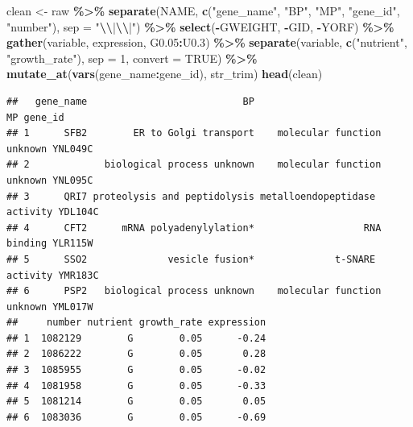 \documentclass[
]{book}
\newenvironment{Shaded}{\begin{snugshade}}{\end{snugshade}}
\newcommand{\AttributeTok}[1]{\textcolor[rgb]{0.13,0.29,0.53}{#1}}
\newcommand{\ConstantTok}[1]{\textcolor[rgb]{0.56,0.35,0.01}{#1}}
\newcommand{\DecValTok}[1]{\textcolor[rgb]{0.00,0.00,0.81}{#1}}
\newcommand{\FloatTok}[1]{\textcolor[rgb]{0.00,0.00,0.81}{#1}}
\newcommand{\FunctionTok}[1]{\textcolor[rgb]{0.13,0.29,0.53}{\textbf{#1}}}
\newcommand{\NormalTok}[1]{#1}
\newcommand{\OtherTok}[1]{\textcolor[rgb]{0.56,0.35,0.01}{#1}}
\newcommand{\SpecialCharTok}[1]{\textcolor[rgb]{0.81,0.36,0.00}{\textbf{#1}}}
\newcommand{\StringTok}[1]{\textcolor[rgb]{0.31,0.60,0.02}{#1}}
\begin{document}
\begin{Shaded}
\begin{Highlighting}[]
\NormalTok{clean }\OtherTok{\textless{}{-}}\NormalTok{ raw }\SpecialCharTok{\%\textgreater{}\%}
  \FunctionTok{separate}\NormalTok{(NAME, }\FunctionTok{c}\NormalTok{(}\StringTok{"gene\_name"}\NormalTok{, }\StringTok{"BP"}\NormalTok{, }\StringTok{"MP"}\NormalTok{, }\StringTok{"gene\_id"}\NormalTok{, }\StringTok{"number"}\NormalTok{), }\AttributeTok{sep =} \StringTok{"}\SpecialCharTok{\textbackslash{}\textbackslash{}}\StringTok{|}\SpecialCharTok{\textbackslash{}\textbackslash{}}\StringTok{|"}\NormalTok{) }\SpecialCharTok{\%\textgreater{}\%}
  \FunctionTok{select}\NormalTok{(}\SpecialCharTok{{-}}\NormalTok{GWEIGHT, }\SpecialCharTok{{-}}\NormalTok{GID, }\SpecialCharTok{{-}}\NormalTok{YORF) }\SpecialCharTok{\%\textgreater{}\%}
  \FunctionTok{gather}\NormalTok{(variable, expression, G0}\FloatTok{.05}\SpecialCharTok{:}\NormalTok{U0}\FloatTok{.3}\NormalTok{) }\SpecialCharTok{\%\textgreater{}\%}
  \FunctionTok{separate}\NormalTok{(variable, }\FunctionTok{c}\NormalTok{(}\StringTok{"nutrient"}\NormalTok{, }\StringTok{"growth\_rate"}\NormalTok{), }\AttributeTok{sep =} \DecValTok{1}\NormalTok{, }\AttributeTok{convert =} \ConstantTok{TRUE}\NormalTok{) }\SpecialCharTok{\%\textgreater{}\%}
  \FunctionTok{mutate\_at}\NormalTok{(}\FunctionTok{vars}\NormalTok{(gene\_name}\SpecialCharTok{:}\NormalTok{gene\_id), str\_trim)}
\FunctionTok{head}\NormalTok{(clean)}
\end{Highlighting}
\end{Shaded}

\begin{verbatim}
##   gene_name                           BP                            MP gene_id
## 1      SFB2        ER to Golgi transport    molecular function unknown YNL049C
## 2             biological process unknown    molecular function unknown YNL095C
## 3      QRI7 proteolysis and peptidolysis metalloendopeptidase activity YDL104C
## 4      CFT2      mRNA polyadenylylation*                   RNA binding YLR115W
## 5      SSO2              vesicle fusion*              t-SNARE activity YMR183C
## 6      PSP2   biological process unknown    molecular function unknown YML017W
##     number nutrient growth_rate expression
## 1  1082129        G        0.05      -0.24
## 2  1086222        G        0.05       0.28
## 3  1085955        G        0.05      -0.02
## 4  1081958        G        0.05      -0.33
## 5  1081214        G        0.05       0.05
## 6  1083036        G        0.05      -0.69
\end{verbatim}
\end{document}
